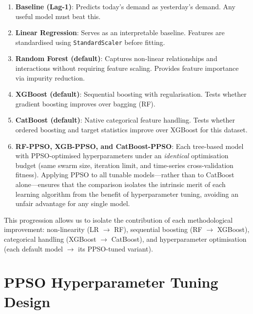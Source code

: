 \begin{enumerate}
    \item \textbf{Baseline (Lag-1)}: Predicts today's demand as yesterday's demand. Any useful model must beat this.

    \item \textbf{Linear Regression}: Serves as an interpretable baseline. Features are standardised using \texttt{StandardScaler} before fitting.
    
    \item \textbf{Random Forest (default)}: Captures non-linear relationships and interactions without requiring feature scaling. Provides feature importance via impurity reduction.
    
    \item \textbf{XGBoost (default)}: Sequential boosting with regularisation. Tests whether gradient boosting improves over bagging (RF).
    
    \item \textbf{CatBoost (default)}: Native categorical feature handling. Tests whether ordered boosting and target statistics improve over XGBoost for this dataset.
    
    \item \textbf{RF-PPSO, XGB-PPSO, and CatBoost-PPSO}: Each tree-based model with PPSO-optimised hyperparameters under an \emph{identical} optimisation budget (same swarm size, iteration limit, and time-series cross-validation fitness). Applying PPSO to all tunable models---rather than to CatBoost alone---ensures that the comparison isolates the intrinsic merit of each learning algorithm from the benefit of hyperparameter tuning, avoiding an unfair advantage for any single model.
\end{enumerate}

This progression allows us to isolate the contribution of each methodological improvement: non-linearity (LR $\to$ RF), sequential boosting (RF $\to$ XGBoost), categorical handling (XGBoost $\to$ CatBoost), and hyperparameter optimisation (each default model $\to$ its PPSO-tuned variant).


\section{PPSO Hyperparameter Tuning Design}\label{sec:ppso_design}

